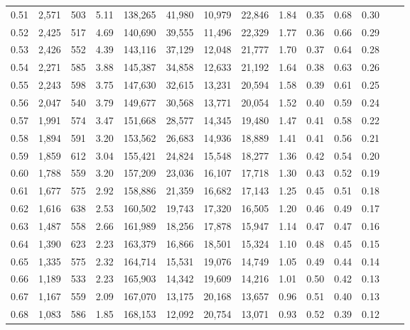 \begin{tabular}{rrrrrrrrrrrrrr}
0.51 &  2,571 &  503 &    5.11 &  138,265 &   41,980 &  10,979 &  22,846 &  1.84 &  0.35 &  0.68 &      0.30 \\
0.52 &  2,425 &  517 &    4.69 &  140,690 &   39,555 &  11,496 &  22,329 &  1.77 &  0.36 &  0.66 &      0.29 \\
0.53 &  2,426 &  552 &    4.39 &  143,116 &   37,129 &  12,048 &  21,777 &  1.70 &  0.37 &  0.64 &      0.28 \\
0.54 &  2,271 &  585 &    3.88 &  145,387 &   34,858 &  12,633 &  21,192 &  1.64 &  0.38 &  0.63 &      0.26 \\
0.55 &  2,243 &  598 &    3.75 &  147,630 &   32,615 &  13,231 &  20,594 &  1.58 &  0.39 &  0.61 &      0.25 \\
0.56 &  2,047 &  540 &    3.79 &  149,677 &   30,568 &  13,771 &  20,054 &  1.52 &  0.40 &  0.59 &      0.24 \\
0.57 &  1,991 &  574 &    3.47 &  151,668 &   28,577 &  14,345 &  19,480 &  1.47 &  0.41 &  0.58 &      0.22 \\
0.58 &  1,894 &  591 &    3.20 &  153,562 &   26,683 &  14,936 &  18,889 &  1.41 &  0.41 &  0.56 &      0.21 \\
0.59 &  1,859 &  612 &    3.04 &  155,421 &   24,824 &  15,548 &  18,277 &  1.36 &  0.42 &  0.54 &      0.20 \\
0.60 &  1,788 &  559 &    3.20 &  157,209 &   23,036 &  16,107 &  17,718 &  1.30 &  0.43 &  0.52 &      0.19 \\
0.61 &  1,677 &  575 &    2.92 &  158,886 &   21,359 &  16,682 &  17,143 &  1.25 &  0.45 &  0.51 &      0.18 \\
0.62 &  1,616 &  638 &    2.53 &  160,502 &   19,743 &  17,320 &  16,505 &  1.20 &  0.46 &  0.49 &      0.17 \\
0.63 &  1,487 &  558 &    2.66 &  161,989 &   18,256 &  17,878 &  15,947 &  1.14 &  0.47 &  0.47 &      0.16 \\
0.64 &  1,390 &  623 &    2.23 &  163,379 &   16,866 &  18,501 &  15,324 &  1.10 &  0.48 &  0.45 &      0.15 \\
0.65 &  1,335 &  575 &    2.32 &  164,714 &   15,531 &  19,076 &  14,749 &  1.05 &  0.49 &  0.44 &      0.14 \\
0.66 &  1,189 &  533 &    2.23 &  165,903 &   14,342 &  19,609 &  14,216 &  1.01 &  0.50 &  0.42 &      0.13 \\
0.67 &  1,167 &  559 &    2.09 &  167,070 &   13,175 &  20,168 &  13,657 &  0.96 &  0.51 &  0.40 &      0.13 \\
0.68 &  1,083 &  586 &    1.85 &  168,153 &   12,092 &  20,754 &  13,071 &  0.93 &  0.52 &  0.39 &      0.12 \\

\end{tabular}
